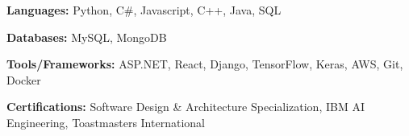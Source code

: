 \begin{siderulesSos}
\begin{skillSection}
\cvskillentry
    {
      \begin{cvsositems}
        \item {\color{black}\textbf{Languages:} Python, C\#, Javascript, C++, Java, SQL}
        \item {\color{black}\textbf{Databases:} MySQL, MongoDB}
        \item {\color{black}\textbf{Tools/Frameworks:} ASP.NET, React, Django, TensorFlow, Keras, AWS, Git, Docker}
        \item {\color{black}\textbf{Certifications:} Software Design \& Architecture Specialization, IBM AI Engineering, Toastmasters International}
      \end{cvsositems}
    }
\end{skillSection}
\end{siderulesSos}